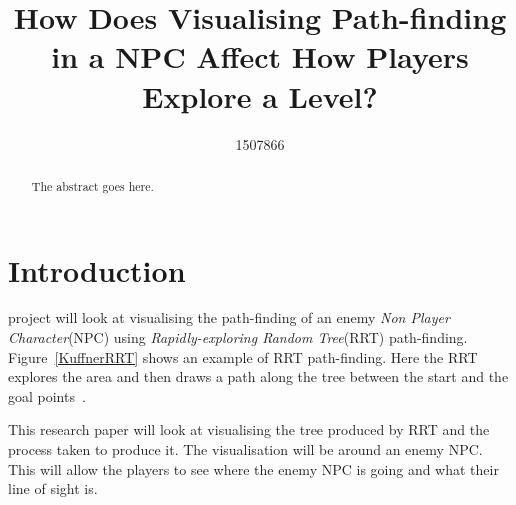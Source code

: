 \documentclass[journal]{IEEEtran}
\begin{document}
%
\title{ How Does Visualising Path-finding in a NPC Affect How Players Explore a Level?}
%
%
\author{1507866}


\maketitle

\begin{abstract}
The abstract goes here.
\end{abstract}

\section{Introduction}
% 
% 
% 
% 
 project will look at visualising the path-finding of an enemy \textit{Non Player Character}(NPC) using \textit{Rapidly-exploring Random Tree}(RRT) path-finding.  Figure~\ref{KuffnerRRT} shows an example of RRT path-finding. Here the RRT explores the area and then draws a path along the tree between the start and the goal points~\cite{Kuffner2000}. 

This research paper will look at visualising the tree produced by RRT and the process taken to produce it. The visualisation will be around an enemy NPC. This will allow the players to see where the enemy NPC is going and what their line of sight is. 
\end{document}
